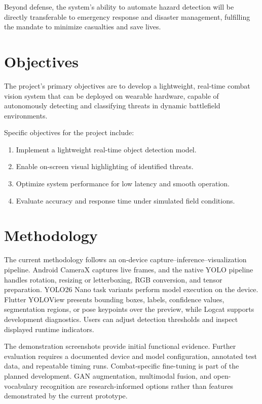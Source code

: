 Beyond defense, the system's ability to automate hazard detection will be directly transferable to
emergency response and disaster management, fulfilling the mandate to minimize casualties and save
lives.

\label{end:motivation}
\section{Objectives}\label{sec:objectives}
The project's primary objectives are to develop a lightweight, real-time combat vision system that
can be deployed on wearable hardware, capable of autonomously detecting and classifying threats in
dynamic battlefield environments. \vspace{6pt}

Specific objectives for the project include:
\begin{enumerate}[label=\roman*.]
  \item Implement a lightweight real-time object detection model.
  \item Enable on-screen visual highlighting of identified threats.
  \item Optimize system performance for low latency and smooth operation.
  \item Evaluate accuracy and response time under simulated field conditions.
  \label{end:objectives}
\end{enumerate}
\section{Methodology}\label{sec:methodology}
The current methodology follows an on-device capture--inference--visualization pipeline. Android
CameraX captures live frames, and the native YOLO pipeline handles rotation, resizing or
letterboxing, RGB conversion, and tensor preparation. YOLO26 Nano task variants perform model
execution on the device. Flutter YOLOView presents bounding boxes, labels, confidence values,
segmentation regions, or pose keypoints over the preview, while Logcat supports development
diagnostics. Users can adjust detection thresholds and inspect displayed runtime indicators.

The demonstration screenshots provide initial functional evidence. Further evaluation requires a
documented device and model configuration, annotated test data, and repeatable timing runs.
Combat-specific fine-tuning is part of the planned development. GAN augmentation,
multimodal fusion, and open-vocabulary recognition are research-informed options rather than
features demonstrated by the current prototype.

